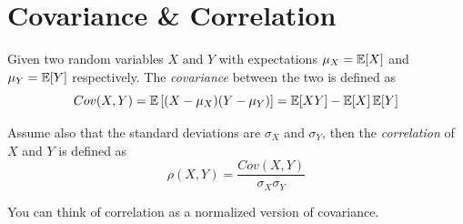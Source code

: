 \section{Covariance \& Correlation}
Given two random variables $X$ and $Y$ with expectations 
$\mu_X = \operatorname{\mathbb{E}}[X]$ and $\mu_Y=\operatorname{\mathbb{E}}[Y]$ respectively. 
The \emph{covariance} between the two is defined as
\[Cov(X,Y) = \operatorname{\mathbb{E}}\left[(X-\mu_X)(Y-\mu_Y)\right]=\operatorname{\mathbb{E}}[XY]-\operatorname{\mathbb{E}}[X]\operatorname{\mathbb{E}}[Y]\]

Assume also that the standard deviations are $\sigma_X$ and $\sigma_Y$, 
then the \emph{correlation} of $X$ and $Y$ is defined as 
\[\rho(X,Y) = \frac{Cov(X,Y)}{\sigma_X\sigma_Y}\]

You can think of correlation as a normalized version of covariance. 

